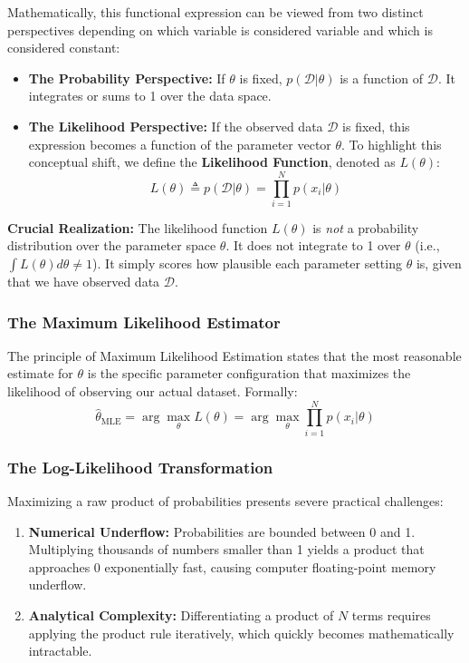 \documentclass{article}
\begin{document}
Mathematically, this functional expression can be viewed from two distinct perspectives depending on which variable is considered variable and which is considered constant:
\begin{itemize}
    \item \textbf{The Probability Perspective:} If $\theta$ is fixed, $p(\mathcal{D}|\theta)$ is a function of $\mathcal{D}$. It integrates or sums to 1 over the data space.
    \item \textbf{The Likelihood Perspective:} If the observed data $\mathcal{D}$ is fixed, this expression becomes a function of the parameter vector $\theta$. To highlight this conceptual shift, we define the \textbf{Likelihood Function}, denoted as $L(\theta)$:
    \begin{equation}
    L(\theta) \triangleq p(\mathcal{D}|\theta) = \prod_{i=1}^N p(x_i|\theta)
    \end{equation}
\end{itemize}
\textbf{Crucial Realization:} The likelihood function $L(\theta)$ is \textit{not} a probability distribution over the parameter space $\theta$. It does not integrate to 1 over $\theta$ (i.e., $\int L(\theta) d\theta \neq 1$). It simply scores how plausible each parameter setting $\theta$ is, given that we have observed data $\mathcal{D}$.

\subsubsection{The Maximum Likelihood Estimator}
The principle of Maximum Likelihood Estimation states that the most reasonable estimate for $\theta$ is the specific parameter configuration that maximizes the likelihood of observing our actual dataset. Formally:
\begin{equation}
\hat{\theta}_{\text{MLE}} = \arg\max_{\theta} L(\theta) = \arg\max_{\theta} \prod_{i=1}^N p(x_i|\theta)
\end{equation}

\subsubsection{The Log-Likelihood Transformation}
Maximizing a raw product of probabilities presents severe practical challenges:
\begin{enumerate}
    \item \textbf{Numerical Underflow:} Probabilities are bounded between 0 and 1. Multiplying thousands of numbers smaller than 1 yields a product that approaches 0 exponentially fast, causing computer floating-point memory underflow.
    \item \textbf{Analytical Complexity:} Differentiating a product of $N$ terms requires applying the product rule iteratively, which quickly becomes mathematically intractable.
\end{enumerate}
\end{document}
